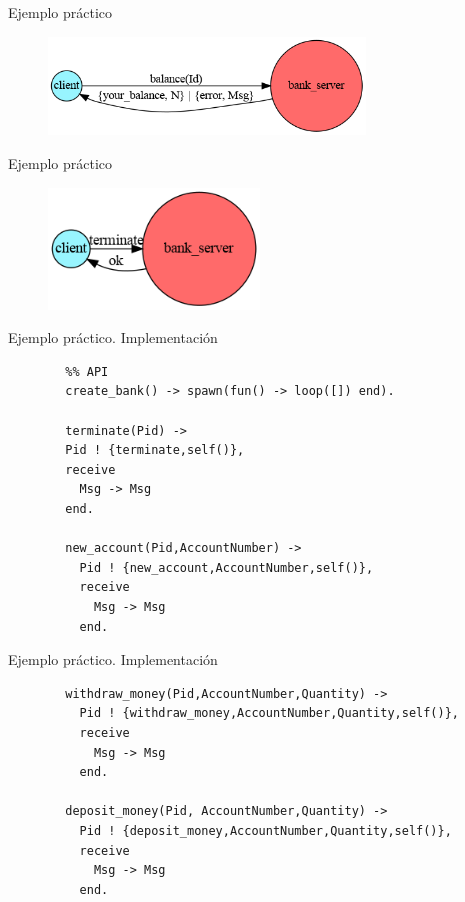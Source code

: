 \documentclass{beamer}
\begin{document}
    \begin{frame}{Ejemplo práctico}
      \begin{figure}
        \includegraphics[width=0.75\textwidth]{6_balance.dot.png}
      \end{figure}
    \end{frame}

    \begin{frame}{Ejemplo práctico}
      \begin{figure}
        \includegraphics[width=0.5\textwidth]{7_terminate.dot.png}
      \end{figure}
    \end{frame}

    \begin{frame}[fragile]{Ejemplo práctico. Implementación}
      \begin{verbatim}
        %% API
        create_bank() -> spawn(fun() -> loop([]) end).

        terminate(Pid) ->
        Pid ! {terminate,self()},
        receive
          Msg -> Msg
        end.

        new_account(Pid,AccountNumber) ->
          Pid ! {new_account,AccountNumber,self()},
          receive
            Msg -> Msg
          end.
      \end{verbatim}
    \end{frame}

    \begin{frame}[fragile]{Ejemplo práctico. Implementación}
      \begin{verbatim}
        withdraw_money(Pid,AccountNumber,Quantity) ->
          Pid ! {withdraw_money,AccountNumber,Quantity,self()},
          receive
            Msg -> Msg
          end.

        deposit_money(Pid, AccountNumber,Quantity) ->
          Pid ! {deposit_money,AccountNumber,Quantity,self()},
          receive
            Msg -> Msg
          end.
      \end{verbatim}
    \end{frame}
\end{document}
